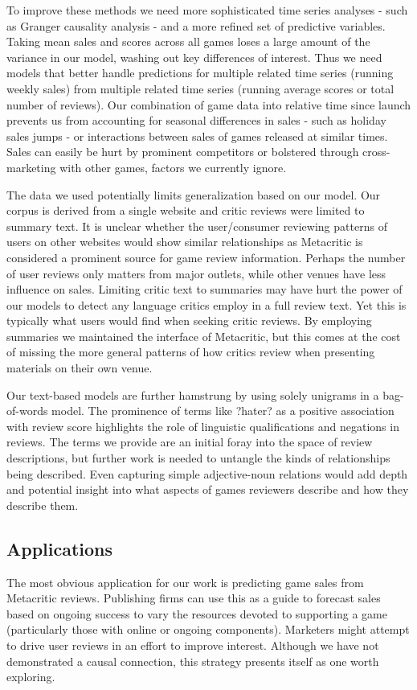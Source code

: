 \documentclass[letterpaper]{article}
\begin{document}
To improve these methods we need more sophisticated time series analyses - such as Granger causality analysis - and a more refined set of predictive variables. Taking mean sales and scores across all games loses a large amount of the variance in our model, washing out key differences of interest. Thus we need models that better handle predictions for multiple related time series (running weekly sales) from multiple related time series (running average scores or total number of reviews). Our combination of game data into relative time since launch prevents us from accounting for seasonal differences in sales - such as holiday sales jumps - or interactions between sales of games released at similar times. Sales can easily be hurt by prominent competitors or bolstered through cross-marketing with other games, factors we currently ignore.

The data we used potentially limits generalization based on our model. Our corpus is derived from a single website and critic reviews were limited to summary text. It is unclear whether the user/consumer reviewing patterns of users on other websites would show similar relationships as Metacritic is considered a prominent source for game review information. Perhaps the number of user reviews only matters from major outlets, while other venues have less influence on sales. Limiting critic text to summaries may have hurt the power of our models to detect any language critics employ in a full review text. Yet this is typically what users would find when seeking critic reviews. By employing summaries we maintained the interface of Metacritic, but this comes at the cost of missing the more general patterns of how critics review when presenting materials on their own venue.

Our text-based models are further hamstrung by using solely unigrams in a bag-of-words model. The prominence of terms like ?hater? as a positive association with review score highlights the role of linguistic qualifications and negations in reviews. The terms we provide are an initial foray into the space of review descriptions, but further work is needed to untangle the kinds of relationships being described. Even capturing simple adjective-noun relations would add depth and potential insight into what aspects of games reviewers describe and how they describe them.

\subsection{Applications}
The most obvious application for our work is predicting game sales from Metacritic reviews. Publishing firms can use this as a guide to forecast sales based on ongoing success to vary the resources devoted to supporting a game (particularly those with online or ongoing components). Marketers might attempt to drive user reviews in an effort to improve interest. Although we have not demonstrated a causal connection, this strategy presents itself as one worth exploring.
\end{document}
